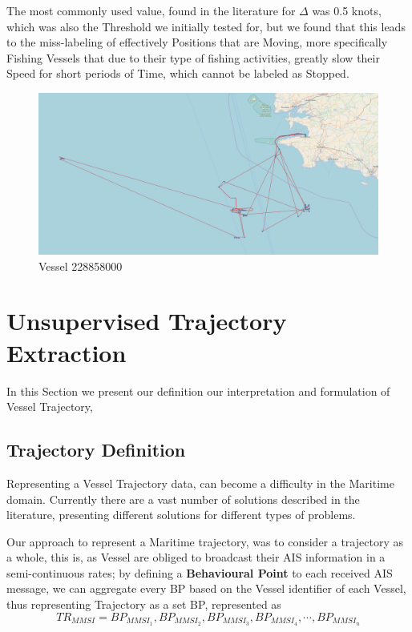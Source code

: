 The most commonly used value, found in the literature for $\Delta$ was 0.5 knots, which was also the Threshold we initially tested for, but we found that this leads to the miss-labeling of effectively Positions that are Moving, more specifically Fishing Vessels that due to their type of fishing activities, greatly slow their Speed for short periods of Time, which cannot be labeled as Stopped.

\begin{figure}[H]
	\centering
	\includegraphics[scale = 0.15]{figures/Ch4/simplestopMoving228858000.png}
    \caption{Vessel 228858000}
    \label{fig: 228858000}
\end{figure}

\section{Unsupervised Trajectory Extraction}
In this Section we present our definition our interpretation and formulation of Vessel Trajectory, 

\subsection{Trajectory Definition}
Representing a Vessel Trajectory data, can become a difficulty in the Maritime domain. Currently there are a vast number of solutions described in the literature, presenting different solutions for different types of problems. 

Our approach to represent a Maritime trajectory, was to consider a trajectory as a whole, this is, as Vessel are obliged to broadcast their AIS information in a semi-continuous rates; by defining a \textbf{Behavioural Point} to each received AIS message, we can aggregate every BP based on the Vessel identifier of each Vessel, thus representing Trajectory as a set BP, represented as 
\[TR_{MMSI} = BP_{MMSI_1}, BP_{MMSI_2}, BP_{MMSI_3}, BP_{MMSI_4}, \cdots , BP_{MMSI_n}\]

